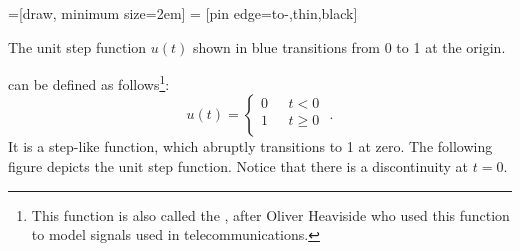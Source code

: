 
=[draw, minimum size=2em]
 = [pin edge={to-,thin,black}]
\begin{marginfigure}[-3cm]
\begin{center}

\end{center}
\caption{The unit step function $u(t)$ shown in blue transitions from 0 to 1 at the origin.}
\end{marginfigure}


 can be defined as
follows\footnote{This function is also called the
  , after Oliver
  Heaviside who used this function to model signals used in
  telecommunications.}:
\begin{equation}
u(t) = \left\{\begin{array}{cl}
0 &~~~ t < 0 \\
1 &~~~ t \ge 0 \\
\end{array}
\right. \,\,.
\end{equation}
It is a step-like function, which abruptly transitions to 1 at
zero. The following figure depicts the unit step function. Notice
that there is a discontinuity at $t=0$. %

